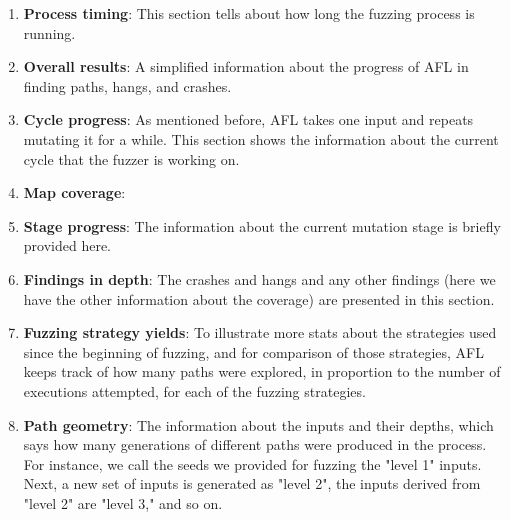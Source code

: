 \begin{enumerate}
    \item \textbf{Process timing}: This section tells about how long the fuzzing process is running.
    \item \textbf{Overall results}: A simplified information about the progress of AFL in finding paths, hangs, and crashes. 
    \item \textbf{Cycle progress}: As mentioned before, AFL takes one input and repeats mutating it for a while. This section shows the information about the current cycle that the fuzzer is working on.
    \item \textbf{Map coverage}: 
    \item \textbf{Stage progress}: The information about the current mutation stage is briefly provided here.
    \item \textbf{Findings in depth}: The crashes and hangs and any other findings (here we have the other information about the coverage) are presented in this section.
    \item \textbf{Fuzzing strategy yields}: To illustrate more stats about the strategies used since the beginning of fuzzing, and for comparison of those strategies, AFL keeps track of how many paths were explored, in proportion to the number of executions attempted, for each of the fuzzing strategies.
    \item \textbf{Path geometry}: The information about the inputs and their depths, which says how many generations of different paths were produced in the process. For instance, we call the seeds we provided for fuzzing the "level 1" inputs. Next, a new set of inputs is generated as "level 2", the inputs derived from "level 2" are "level 3," and so on.
\end{enumerate}